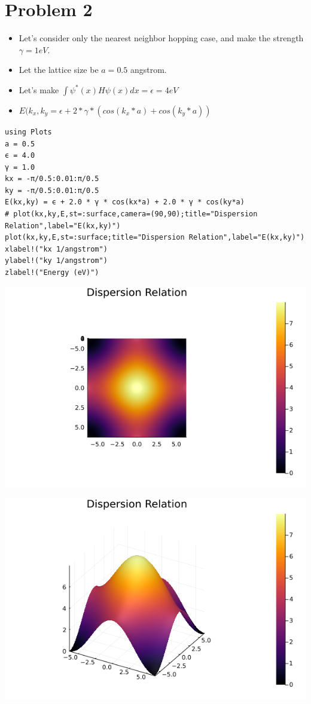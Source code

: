 \documentclass[11pt]{article}
\begin{document}
\section{Problem 2}
\label{sec:orge31d2fd}
\begin{itemize}
\item Let's consider only the nearest neighbor hopping case, and make the strength
\(\gamma = 1 eV\).
\item Let the lattice size be \(a = 0.5\) angstrom.
\item Let's make \(\int \psi^{*}(x)H\psi(x)dx = \epsilon = 4 eV\)
\item \(E(k_{x},k_{y} = \epsilon + 2 * \gamma * (cos(k_{x} * a) + cos(k_{y}*a))\)
\end{itemize}
\begin{verbatim}
using Plots
a = 0.5
ϵ = 4.0
γ = 1.0
kx = -π/0.5:0.01:π/0.5
ky = -π/0.5:0.01:π/0.5
E(kx,ky) = ϵ + 2.0 * γ * cos(kx*a) + 2.0 * γ * cos(ky*a)
# plot(kx,ky,E,st=:surface,camera=(90,90);title="Dispersion Relation",label="E(kx,ky)")
plot(kx,ky,E,st=:surface;title="Dispersion Relation",label="E(kx,ky)")
xlabel!("kx 1/angstrom")
ylabel!("ky 1/angstrom")
zlabel!("Energy (eV)")
\end{verbatim}
\begin{center}
\includegraphics[width=.9\linewidth]{./topview.png}
\end{center}
\begin{center}
\includegraphics[width=.9\linewidth]{./angle_view.png}
\end{center}
\end{document}
